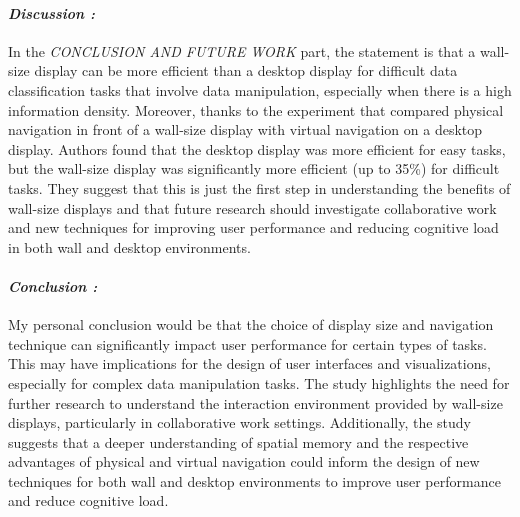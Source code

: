 \begin{multicols}{2}
        \paragraph{ \textit{Discussion :}
                \newline }
        \indent \indent In the \textit{CONCLUSION AND FUTURE WORK} part, the statement is that a wall-size display can be more efficient than a desktop display for difficult data classification tasks that involve data manipulation, especially when there is a high information density. 
        Moreover, thanks to the experiment that compared physical navigation in front of a wall-size display with virtual navigation on a desktop display. Authors found that the desktop display was more efficient for easy tasks, but the wall-size display was significantly more efficient 
        (up to 35\%) for difficult tasks. They suggest that this is just the first step in understanding the benefits of wall-size displays and that future research should investigate collaborative work and new techniques for improving user performance and reducing cognitive load in 
        both wall and desktop environments.

        \paragraph{ \textit{Conclusion :}
                \newline }
        \indent \indent My personal conclusion would be that the choice of display size and navigation technique can significantly impact user performance for certain types of tasks. This may have implications for the design of user interfaces and visualizations, especially for complex 
        data manipulation tasks. The study highlights the need for further research to understand the interaction environment provided by wall-size displays, particularly in collaborative work settings. Additionally, the study suggests that a deeper understanding of spatial memory and 
        the respective advantages of physical and virtual navigation could inform the design of new techniques for both wall and desktop environments to improve user performance and reduce cognitive load.
    \end{multicols}